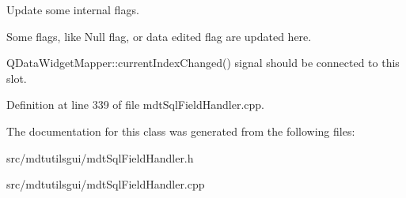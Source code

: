 Update some internal flags. 

Some flags, like Null flag, or data edited flag are updated here.

QDataWidgetMapper::currentIndexChanged() signal should be connected to this slot. 

Definition at line 339 of file mdtSqlFieldHandler.cpp.



The documentation for this class was generated from the following files:\begin{DoxyCompactItemize}
\item 
src/mdtutilsgui/mdtSqlFieldHandler.h\item 
src/mdtutilsgui/mdtSqlFieldHandler.cpp\end{DoxyCompactItemize}
